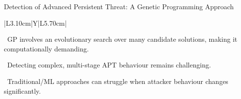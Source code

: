 \begin{frame}[t]{Detection of Advanced Persistent Threat: A Genetic Programming Approach}
{\begin{tabularx}{\textwidth}{|L{3.10cm}|Y|L{5.70cm}|}
\begin{minipage}[t]{\linewidth}
\textbullet~GP involves an evolutionary search over many candidate solutions, making it computationally demanding.\par\vspace{1.8pt}\textbullet~Detecting complex, multi-stage APT behaviour remains challenging.\par\vspace{1.8pt}\textbullet~Traditional/ML approaches can struggle when attacker behaviour changes significantly.\par\vspace{3pt}
\end{minipage} \\\hline
\end{tabularx}}
\end{frame}

